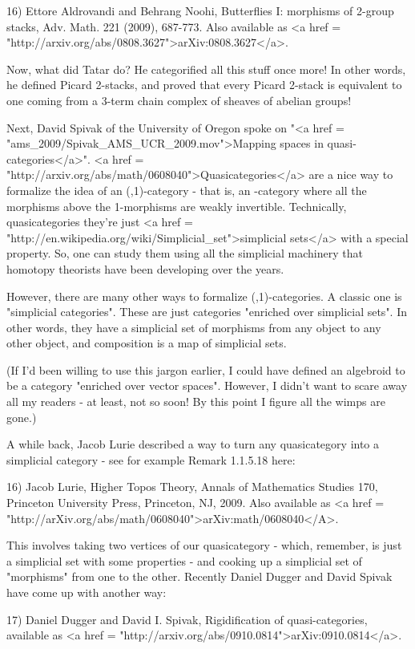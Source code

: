 16) Ettore Aldrovandi and Behrang Noohi, Butterflies I: morphisms of
2-group stacks, Adv. Math. 221 (2009), 687-773.  Also available as <a
href = "http://arxiv.org/abs/0808.3627">arXiv:0808.3627</a>.

Now, what did Tatar do?  He categorified all this stuff once more!
In other words, he defined Picard 2-stacks, and proved that every
Picard 2-stack is equivalent to one coming from a 3-term chain
complex of sheaves of abelian groups!  

Next, David Spivak of the University of Oregon spoke on "<a href
= "ams_2009/Spivak_AMS_UCR_2009.mov">Mapping spaces in
quasi-categories</a>".  <a href =
"http://arxiv.org/abs/math/0608040">Quasicategories</a> are a nice way
to formalize the idea of an (\infty ,1)-category - that is, an
\infty -category where all the morphisms above the 1-morphisms are
weakly invertible.  Technically, quasicategories they're just <a href
= "http://en.wikipedia.org/wiki/Simplicial_set">simplicial sets</a>
with a special property.  So, one can study them using all the
simplicial machinery that homotopy theorists have been developing over
the years.

However, there are many other ways to formalize
(\infty ,1)-categories.  A classic one is "simplicial
categories".  These are just categories "enriched over
simplicial sets".  In other words, they have a simplicial set of
morphisms from any object to any other object, and composition is a
map of simplicial sets.

(If I'd been willing to use this jargon earlier, I could have defined
an algebroid to be a category "enriched over vector spaces".
However, I didn't want to scare away all my readers - at least, not so
soon!  By this point I figure all the wimps are gone.)

A while back, Jacob Lurie described a way to turn any quasicategory
into a simplicial category - see for example Remark 1.1.5.18 here:

16) Jacob Lurie, Higher Topos Theory, Annals of Mathematics Studies
170, Princeton University Press, Princeton, NJ, 2009.  Also available
as <a href =
"http://arXiv.org/abs/math/0608040">arXiv:math/0608040</A>.

This involves taking two vertices of our quasicategory - which,
remember, is just a simplicial set with some properties - and
cooking up a simplicial set of "morphisms" from one to the other.
Recently Daniel Dugger and David Spivak have come up with another
way:

17) Daniel Dugger and David I. Spivak, Rigidification of
quasi-categories, available as <a href = "http://arxiv.org/abs/0910.0814">arXiv:0910.0814</a>.

